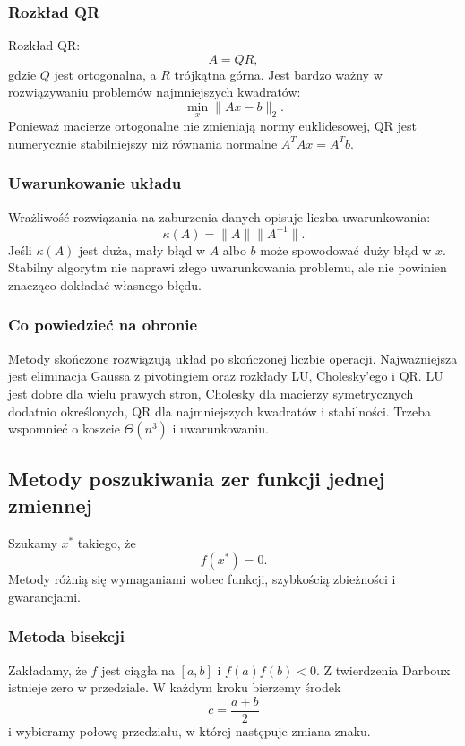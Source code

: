 \subsubsection{Rozkład QR}

Rozkład QR:
\[
A=QR,
\]
gdzie $Q$ jest ortogonalna, a $R$ trójkątna górna. Jest bardzo ważny w rozwiązywaniu problemów najmniejszych kwadratów:
\[
\min_x \|Ax-b\|_2.
\]
Ponieważ macierze ortogonalne nie zmieniają normy euklidesowej, QR jest numerycznie stabilniejszy niż równania normalne $A^TAx=A^Tb$.

\subsubsection{Uwarunkowanie układu}

Wrażliwość rozwiązania na zaburzenia danych opisuje liczba uwarunkowania:
\[
\kappa(A)=\|A\|\|A^{-1}\|.
\]
Jeśli $\kappa(A)$ jest duża, mały błąd w $A$ albo $b$ może spowodować duży błąd w $x$. Stabilny algorytm nie naprawi złego uwarunkowania problemu, ale nie powinien znacząco dokładać własnego błędu.

\subsubsection{Co powiedzieć na obronie}

Metody skończone rozwiązują układ po skończonej liczbie operacji. Najważniejsza jest eliminacja Gaussa z pivotingiem oraz rozkłady LU, Cholesky'ego i QR. LU jest dobre dla wielu prawych stron, Cholesky dla macierzy symetrycznych dodatnio określonych, QR dla najmniejszych kwadratów i stabilności. Trzeba wspomnieć o koszcie $\Theta(n^3)$ i uwarunkowaniu.

\subsection{Metody poszukiwania zer funkcji jednej zmiennej}

Szukamy $x^*$ takiego, że
\[
f(x^*)=0.
\]
Metody różnią się wymaganiami wobec funkcji, szybkością zbieżności i gwarancjami.

\subsubsection{Metoda bisekcji}

Zakładamy, że $f$ jest ciągła na $[a,b]$ i $f(a)f(b)<0$. Z twierdzenia Darboux istnieje zero w przedziale. W każdym kroku bierzemy środek
\[
c=\frac{a+b}{2}
\]
i wybieramy połowę przedziału, w której następuje zmiana znaku.


